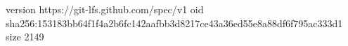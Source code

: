 version https://git-lfs.github.com/spec/v1
oid sha256:153183bb64f1f4a2b6fc142aafbb3d8217ce43a36ed55e8a88df6f795ac333d1
size 2149
